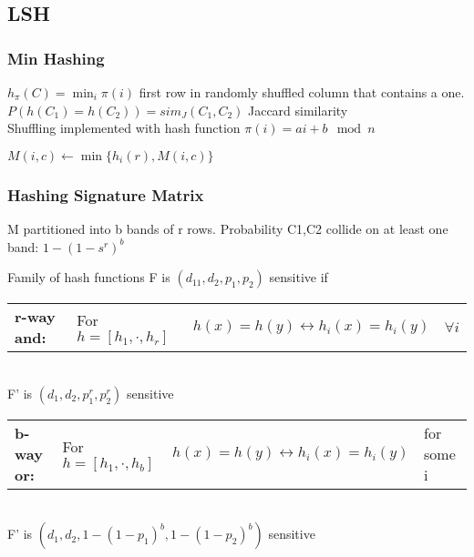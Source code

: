 \documentclass[10pt,parskip]{scrartcl}
\begin{document}
\begin{multicols*}{3}
\subsection{LSH} %
\label{sub:lsh}
\subsubsection{Min Hashing} %
\label{ssub:min_hashing}
$h_\pi(C) = \min_i \pi(i)$ first row in randomly shuffled column that contains a one. \\
$P(h(C_1)=h(C_2)) = sim_J(C_1,C_2)$ Jaccard similarity \\
Shuffling implemented with hash function $\pi(i) = a i + b \mod n$ 
\begin{mdframed}
	\begin{algorithmic}
						 \State $M(i,c) \gets \min  \{ h_i(r),M(i,c) \} $
					\EndFor
				\EndIf
			\EndFor
		\EndFor
	\end{algorithmic}
\end{mdframed}
\subsubsection{Hashing Signature Matrix} %
\label{ssub:hashing_signature_matrix}
	M partitioned into b bands of r rows.  Probability C1,C2 collide on at least one band: $1-(1-s^r)^b$
	
	Family of hash functions F is $(d_11,d_2,p_1,p_2)$ sensitive if
	\tabcolsep=0.11cm\begin{tabular}{l l l l}
		\textbf{r-way and:} & For $h=[h_1,\cdot,h_r]$ & $h(x)=h(y) \leftrightarrow h_i(x)=h_i(y)$ & $\forall i$
	\end{tabular} \\
	F' is $(d_1,d_2,p_1^r,p_2^r)$ sensitive
	
	\tabcolsep=0.11cm\begin{tabular}{l l l l}
		\textbf{b-way or:} & For $h=[h_1,\cdot,h_b]$  & $h(x)=h(y) \leftrightarrow h_i(x)=h_i(y)$ & for some i
	\end{tabular} \\
	F' is $(d_1,d_2,1-(1-p_1)^b,1-(1-p_2)^b)$ sensitive

\end{multicols*}
\end{document}
